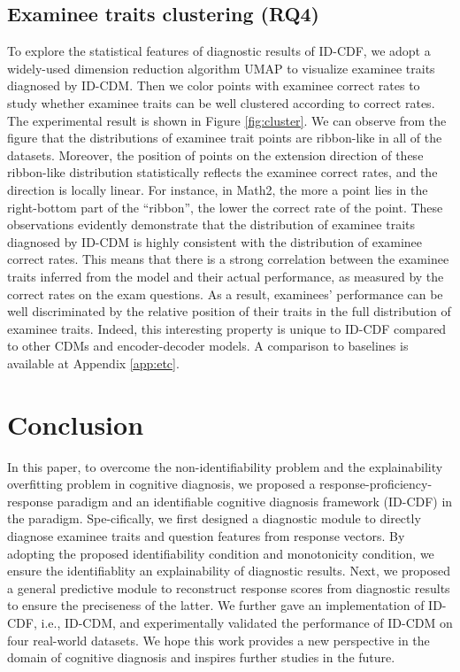 \documentclass[sigconf]{acmart}
\begin{document}
\subsection{Examinee traits clustering (RQ4)}\label{sec:exp-case}
\par To explore the statistical features of diagnostic results of ID-CDF, we adopt a widely-used dimension reduction algorithm UMAP \cite{mcinnes2020umap} to visualize examinee traits diagnosed by ID-CDM. Then we color points with examinee correct rates to study whether examinee traits can be well clustered according to correct rates. The experimental result is shown in Figure \ref{fig:cluster}. We can observe from the figure that the distributions of examinee trait points are ribbon-like in all of the datasets. Moreover, the position of points on the extension direction of these ribbon-like distribution statistically reflects the examinee correct rates, and the direction is locally linear. For instance, in Math2, the more a point lies in the right-bottom part of the ``ribbon'', the lower the correct rate of the point. These observations evidently demonstrate that the distribution of examinee traits diagnosed by ID-CDM is highly consistent with the distribution of examinee correct rates. This means that there is a strong correlation between the examinee traits inferred from the model and their actual performance, as measured by the correct rates on the exam questions. As a result, examinees' performance can be well discriminated by the relative position of their traits in the full distribution of examinee traits. Indeed, this interesting property is unique to ID-CDF compared to other CDMs and encoder-decoder models. A comparison to baselines is available at Appendix \ref{app:etc}.


\vspace{-5pt}
\section{Conclusion}
\par In this paper, to overcome the non-identifiability problem and the explainability overfitting problem in cognitive diagnosis, we proposed a response-proficiency-response paradigm and an identifiable cognitive diagnosis framework (ID-CDF) in the paradigm. Spe-cifically, we first designed a diagnostic module to directly diagnose examinee traits and question features from response vectors. By adopting the proposed identifiability condition and monotonicity condition, we ensure the identifiablity an explainability of diagnostic results. Next, we proposed a general predictive module to reconstruct response scores from diagnostic results to ensure the preciseness of the latter. We further gave an implementation of ID-CDF, i.e., ID-CDM, and experimentally validated the performance of ID-CDM on four real-world datasets. We hope this work provides a new perspective in the domain of cognitive diagnosis and inspires further studies in the future.
\end{document}
